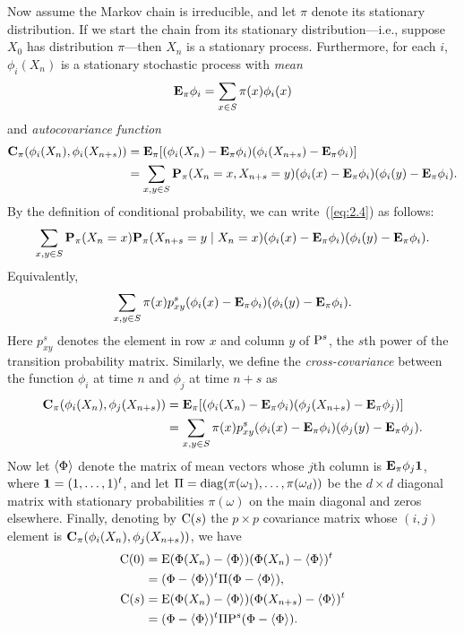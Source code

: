 Now assume the Markov chain is irreducible, and let $\pi$ denote its stationary distribution.
If we start the chain from its stationary distribution---i.e., suppose $X_0$ has
distribution $\pi$---then $X_n$ is a stationary process. 
Furthermore, for each $i$, $\phi_i(X_n)$ is a stationary stochastic process with
\emph{mean}
\[
\bE_\pi\phi_i = \sum_{x\in S} \pi(x)\phi_i(x)
\]
and \emph{autocovariance function}
\begin{align}
\bC_\pi (\phi_i(X_n),  \phi_i (X_{n+s})) 
&= \bE_\pi[(\phi_i(X_n) - \bE_\pi\phi_i)(\phi_i(X_{n+s}) - \bE_\pi\phi_i)]\\
&= \sum_{x, y\in S} \bP_\pi(X_n = x, X_{n+s} = y) (\phi_i(x)- \bE_\pi\phi_i)(\phi_i(y) - \bE_\pi\phi_i).\nonumber
\end{align}
By the definition of conditional probability, we can write~(\ref{eq:2.4}) as follows:
\[
\sum_{x, y\in S} \bP_\pi(X_n = x) \bP_\pi(X_{n+s} = y\mid X_n = x) (\phi_i(x)-
\bE_\pi\phi_i)(\phi_i(y) - \bE_\pi\phi_i).
\]
Equivalently,
\[
\sum_{x, y\in S} \pi(x)p^s_{xy} (\phi_i(x)-\bE_\pi\phi_i)(\phi_i(y) - \bE_\pi\phi_i).
\]
Here $p^s_{xy}$ denotes the element in row $x$ and column $y$ of $\P^s$, the
$s$th power of the transition probability matrix. 
Similarly, we define the \emph{cross-covariance} between the function 
$\phi_i$ at time $n$ and $\phi_j$ at time $n+s$ as
\begin{align}
\bC_\pi (\phi_i(X_n),  \phi_j (X_{n+s})) 
&= \bE_\pi[(\phi_i(X_n) - \bE_\pi\phi_i)(\phi_j(X_{n+s}) - \bE_\pi\phi_j)]\nonumber\\
&= \sum_{x, y\in S} \pi(x)p^s_{xy} (\phi_i(x)-\bE_\pi\phi_i)(\phi_j(y) - \bE_\pi\phi_j).
\end{align}
Now let $\<\Phi\>$ denote the matrix of mean vectors whose $j$th column is 
$\bE_\pi\phi_j\one$, where $\one = (1,\dots, 1)^t$,
and let $\Pi = \diag(\pi(\omega_1),\dots, \pi(\omega_d))$ be the $d \times d$
diagonal matrix with stationary probabilities $\pi(\omega)$
on the main diagonal and zeros elsewhere. 
Finally, denoting by $\C(s)$ the $p \times p$ covariance matrix
whose $(i,j)$ element is $\bC_\pi(\phi_i(X_n), \phi_j(X_{n+s}))$, we have
\begin{align*}
\C(0) &= \E(\Phi(X_n) - \<\Phi\>)(\Phi(X_n) - \<\Phi\>)^t\\
&= (\Phi - \<\Phi\>)^t\Pi (\Phi-\<\Phi\>), \\
\C(s) &= \E(\Phi(X_n) - \<\Phi\>)(\Phi(X_{n+s}) - \<\Phi\>)^t\\
&= (\Phi - \<\Phi\>)^t \Pi \P^s (\Phi - \<\Phi\>).
\end{align*}

